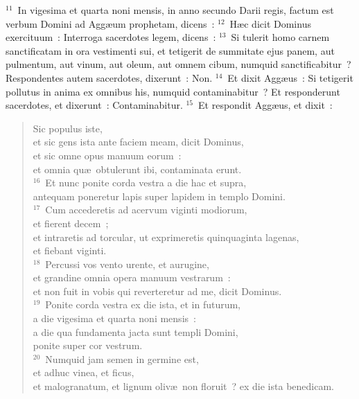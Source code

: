 ${}^{11}$~In vigesima et quarta noni mensis, in anno secundo Darii regis, factum est verbum Domini ad Agg\ae um prophetam, dicens~:
${}^{12}$~H\ae c dicit Dominus exercituum~: Interroga sacerdotes legem, dicens~:
${}^{13}$~Si tulerit homo carnem sanctificatam in ora vestimenti sui, et tetigerit de summitate ejus panem, aut pulmentum, aut vinum, aut oleum, aut omnem cibum, numquid sanctificabitur~? Respondentes autem sacerdotes, dixerunt~: Non.
${}^{14}$~Et dixit Agg\ae us~: Si tetigerit pollutus in anima ex omnibus his, numquid contaminabitur~? Et responderunt sacerdotes, et dixerunt~: Contaminabitur.
${}^{15}$~Et respondit Agg\ae us, et dixit~: \begin{flushleft}\begin{verse}Sic populus iste,\\ et sic gens ista ante faciem meam, dicit Dominus,\\ et sic omne opus manuum eorum~:\\ et omnia qu\ae\ obtulerunt ibi, contaminata erunt.\\
${}^{16}$~Et nunc ponite corda vestra a die hac et supra,\\ antequam poneretur lapis super lapidem in templo Domini.\\
${}^{17}$~Cum accederetis ad acervum viginti modiorum,\\ et fierent decem~;\\ et intraretis ad torcular, ut exprimeretis quinquaginta lagenas,\\ et fiebant viginti.\\
${}^{18}$~Percussi vos vento urente, et aurugine,\\ et grandine omnia opera manuum vestrarum~:\\ et non fuit in vobis qui reverteretur ad me, dicit Dominus.\\
${}^{19}$~Ponite corda vestra ex die ista, et in futurum,\\ a die vigesima et quarta noni mensis~:\\ a die qua fundamenta jacta sunt templi Domini,\\ ponite super cor vestrum.\\
${}^{20}$~Numquid jam semen in germine est,\\ et adhuc vinea, et ficus,\\ et malogranatum, et lignum oliv\ae\ non floruit~? ex die ista benedicam.\end{verse}\end{flushleft}


